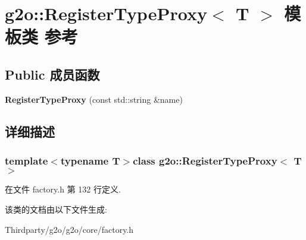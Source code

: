 \hypertarget{classg2o_1_1RegisterTypeProxy}{\section{g2o\-:\-:Register\-Type\-Proxy$<$ T $>$ 模板类 参考}
\label{classg2o_1_1RegisterTypeProxy}
}
\subsection*{Public 成员函数}
\begin{DoxyCompactItemize}
\item 
\hypertarget{classg2o_1_1RegisterTypeProxy_a179d0d498d8a53f9432d1635019705f5}{{\bfseries Register\-Type\-Proxy} (const std\-::string \&name)}\label{classg2o_1_1RegisterTypeProxy_a179d0d498d8a53f9432d1635019705f5}

\end{DoxyCompactItemize}


\subsection{详细描述}
\subsubsection*{template$<$typename T$>$class g2o\-::\-Register\-Type\-Proxy$<$ T $>$}



在文件 factory.\-h 第 132 行定义.



该类的文档由以下文件生成\-:\begin{DoxyCompactItemize}
\item 
Thirdparty/g2o/g2o/core/factory.\-h\end{DoxyCompactItemize}

